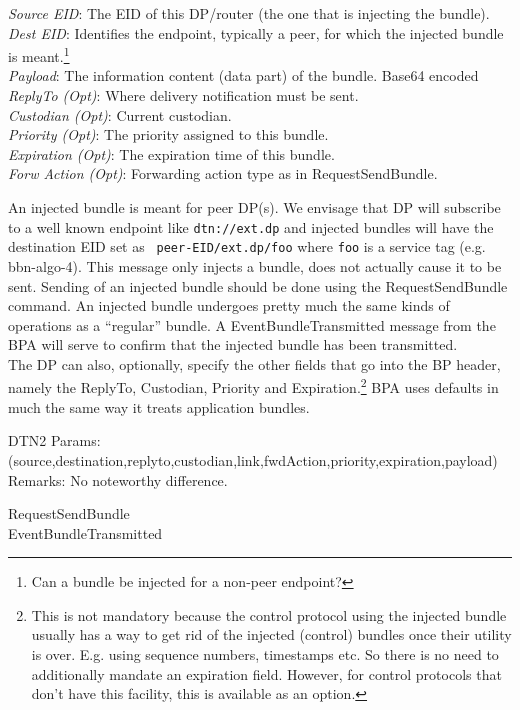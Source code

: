 {
\metP
    {\em Source EID}: The EID of this DP/router (the one that is
    injecting the bundle).\\
    {\em Dest EID}: Identifies the endpoint, typically a peer, for which 
    the injected bundle is meant.\footnote{Can a bundle be injected for a
    non-peer endpoint?}\\
    {\em Payload}: The information content (data part) of the bundle. Base64
    encoded~\cite{MITRE-IF}\\
    {\em ReplyTo (Opt)}: Where delivery notification must be sent.\\
    {\em Custodian (Opt)}: Current custodian.\\
    {\em Priority (Opt)}: The priority assigned to this bundle.\\
    {\em Expiration (Opt)}: The expiration time of this bundle.\\
    {\em Forw Action (Opt)}: Forwarding action type as in RequestSendBundle.

\metD
    An injected bundle is meant for peer DP(s). We envisage that DP
    will subscribe to a well known endpoint like {\tt dtn://ext.dp}
    and injected bundles will have the destination EID set as {\tt
    peer-EID/ext.dp/foo} where {\tt foo} is a service tag
    (e.g. bbn-algo-4). This message only injects a bundle, does not
    actually cause it to be sent. Sending of an injected bundle should
    be done using the RequestSendBundle command.  An injected bundle
    undergoes pretty much the same kinds of operations as a
    ``regular'' bundle. A EventBundleTransmitted message from the BPA
    will serve to confirm that the injected bundle has been
    transmitted.\\

    The DP can also, optionally, specify the other fields that go into
    the BP header, namely the ReplyTo, Custodian, Priority and
    Expiration.\footnote{This is not mandatory because the control
    protocol using the injected bundle usually has a way to get rid of
    the injected (control) bundles once their utility is
    over. E.g. using sequence numbers, timestamps etc. So there is no
    need to additionally mandate an expiration field. However, for control
    protocols that don't have this facility, this is available as an option.}
     BPA uses defaults
    in much the same way it treats application bundles.

\metM
    DTN2 Params: (source,destination,replyto,custodian,link,fwdAction,priority,expiration,payload)\\
    Remarks: No noteworthy difference.

\metR
    RequestSendBundle\\
    EventBundleTransmitted\\
}

